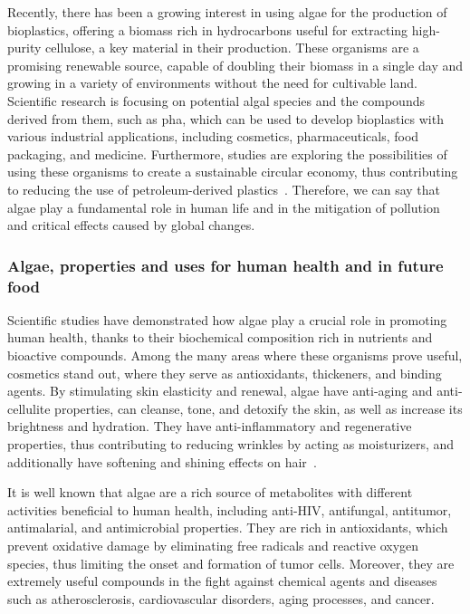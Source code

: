 Recently, there has been a growing interest in using algae for the production of bioplastics, offering a biomass rich in hydrocarbons useful for extracting high-purity cellulose, a key material in their production. These organisms are a promising renewable source, capable of doubling their biomass in a single day and growing in a variety of environments without the need for cultivable land. Scientific research is focusing on potential algal species and the compounds derived from them, such as \gls{pha}, which can be used to develop bioplastics with various industrial applications, including cosmetics, pharmaceuticals, food packaging, and medicine. Furthermore, studies are exploring the possibilities of using these organisms to create a sustainable circular economy, thus contributing to reducing the use of petroleum-derived plastics~\parencite{dang_Current_2022}. Therefore, we can say that algae play a fundamental role in human life and in the mitigation of pollution and critical effects caused by global changes.


\subsubsection{Algae, properties and uses for human health and in future food}
Scientific studies have demonstrated how algae play a crucial role in promoting human health, thanks to their biochemical composition rich in nutrients and bioactive compounds. Among the many areas where these organisms prove useful, cosmetics stand out, where they serve as antioxidants, thickeners, and binding agents. By stimulating skin elasticity and renewal, algae have anti-aging and anti-cellulite properties, can cleanse, tone, and detoxify the skin, as well as increase its brightness and hydration. They have anti-inflammatory and regenerative properties, thus contributing to reducing wrinkles by acting as moisturizers, and additionally have softening and shining effects on hair~\parencite{garima_diverse_2015}.

It is well known that algae are a rich source of metabolites with different activities beneficial to human health, including anti-HIV, antifungal, antitumor, antimalarial, and antimicrobial properties. They are rich in antioxidants, which prevent oxidative damage by eliminating free radicals and reactive oxygen species, thus limiting the onset and formation of tumor cells. Moreover, they are extremely useful compounds in the fight against chemical agents and diseases such as atherosclerosis, cardiovascular disorders, aging processes, and cancer. 

